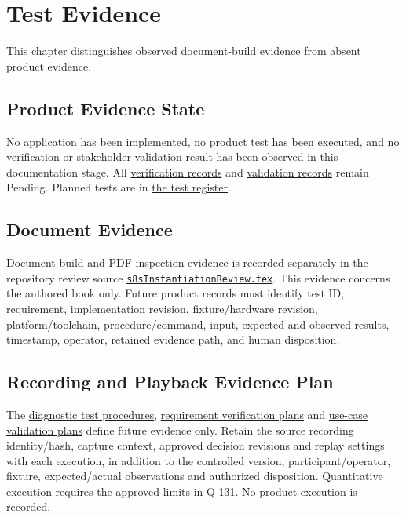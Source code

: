 \chapter{Test Evidence}
\label{Section:TestEvidenceResponsibility}
This chapter distinguishes observed document-build evidence from absent product evidence.



\section{Product Evidence State}
No application has been implemented, no product test has been executed, and no verification or stakeholder validation result has been observed in this documentation stage. All \hyperref[Table:VerificationRegister]{verification records} and \hyperref[Table:ValidationRegister]{validation records} remain Pending. Planned tests are in \hyperref[Table:ProjectTests]{the test register}.

\section{Document Evidence}
Document-build and PDF-inspection evidence is recorded separately in the repository review source \href{s8sInstantiationReview.tex}{\texttt{s8sInstantiationReview.tex}}. This evidence concerns the authored book only. Future product records must identify test ID, requirement, implementation revision, fixture/hardware revision, platform/toolchain, procedure/command, input, expected and observed results, timestamp, operator, retained evidence path, and human disposition.

\section{Recording and Playback Evidence Plan}
The \hyperref[Table:RecordingPlaybackTests]{diagnostic test procedures},
\hyperref[Table:RecordingPlaybackVerification]{requirement verification plans}
and \hyperref[Table:RecordingPlaybackValidation]{use-case validation plans}
define future evidence only. Retain the source recording identity/hash,
capture context, approved decision revisions and replay settings with each
execution, in addition to the controlled version, participant/operator,
fixture, expected/actual observations and authorized disposition.
Quantitative execution requires the approved limits in
\hyperref[Question:Q-131]{Q-131}. No product execution is recorded.

